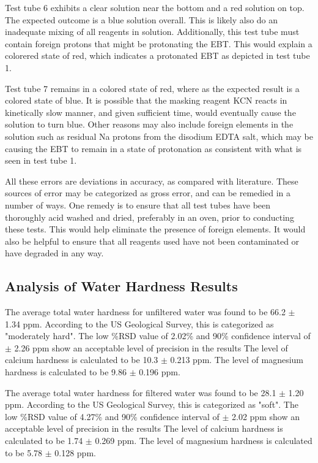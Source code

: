 \documentclass{article}
\begin{document}
Test tube 6 exhibits a clear solution near the bottom and a red solution on top.
The expected outcome is a blue solution overall. This is likely also do an
inadequate mixing of all reagents in solution. Additionally, this test tube must
contain foreign protons that might be protonating the EBT. This would explain a
colorered state of red, which indicates a protonated EBT as depicted in test
tube 1.

Test tube 7 remains in a colored state of red, where as the expected result is
a colored state of blue. It is possible that the masking reagent KCN reacts in
kinetically slow manner, and given sufficient time, would eventually cause the
solution to turn blue. Other reasons may also include foreign elements in the
solution such as residual Na protons from the disodium EDTA salt, which may be
causing the EBT to remain in a state of protonation as consistent with what is
seen in test tube 1.

All these errors are deviations in accuracy, as compared with
literature. \cite{lab_man} These sources of error may be categorized as gross
error, and can be remedied in a number of ways. One remedy is to ensure that all
test tubes have been thoroughly acid washed and dried, preferably in an oven,
prior to conducting these tests. This would help eliminate the presence of
foreign elements. It would also be helpful to ensure that all reagents used have
not been contaminated or have degraded in any way.


\subsection {Analysis of Water Hardness Results}

The average total water hardness for unfiltered water was found to be 66.2 $\pm$
1.34 ppm. According to the US Geological Survey, this is categorized as
"moderately hard". 
The low \%RSD value of 2.02\% and 90\% confidence interval of $\pm$ 2.26 ppm show an
acceptable level of precision in the results
The level of calcium hardness is calculated to be 10.3 $\pm$ 0.213 ppm.
The level of magnesium hardness is calculated to be 9.86 $\pm$ 0.196 ppm.

The average total water hardness for filtered water was found to be 28.1 $\pm$ 1.20 ppm. According
to the US Geological Survey, this is categorized as "soft".
The low \%RSD value of 4.27\% and 90\% confidence interval of $\pm$ 2.02 ppm show an
acceptable level of precision in the results
The level of calcium hardness is calculated to be 1.74 $\pm$ 0.269 ppm.
The level of magnesium hardness is calculated to be 5.78 $\pm$ 0.128 ppm.
\end{document}
